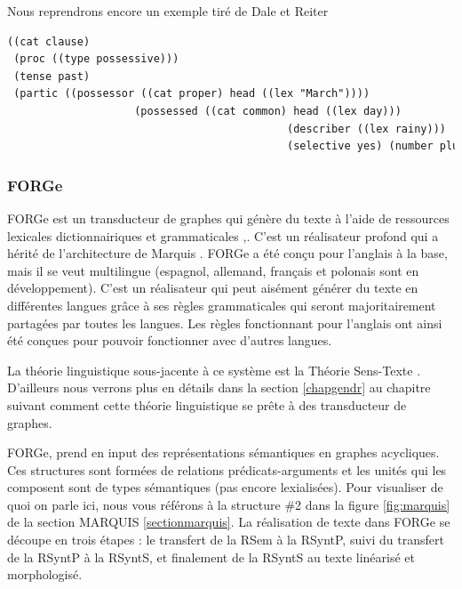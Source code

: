 Nous reprendrons encore un exemple tiré de Dale et Reiter \cite{ReiterBuildingNaturalLanguage2000} 
\begin{lstlisting}[language=Xml, caption=FD: input de Surge, label=surge]
((cat clause)
 (proc ((type possessive)))
 (tense past)
 (partic ((possessor ((cat proper) head ((lex "March"))))
					(possessed ((cat common) head ((lex day)))
											(describer ((lex rainy)))
											(selective yes) (number plural)))))
\end{lstlisting}

\subsubsection{FORGe}
FORGe est un transducteur de graphes qui génère du texte à l'aide de ressources lexicales dictionnairiques et grammaticales \citep{MilledemoFORGePompeu2017},\citep{DBLP:conf/semeval/MilleCBW17}. C'est un réalisateur profond qui a hérité de l'architecture de Marquis \citep{WannerMARQUISGENERATIONUSERTAILORED2010}. FORGe a été conçu pour l'anglais à la base, mais il se veut multilingue (espagnol, allemand, français et polonais sont en développement). C'est un réalisateur qui peut aisément générer du texte en différentes langues grâce à ses règles grammaticales qui seront majoritairement partagées par toutes les langues. Les règles fonctionnant pour l'anglais ont ainsi été conçues pour pouvoir fonctionner avec d'autres langues.

La théorie linguistique sous-jacente à ce système est la Théorie Sens-Texte . D'ailleurs nous verrons plus en détails dans la section \ref{chapgendr} au chapitre suivant comment cette théorie linguistique se prête à des transducteur de graphes.

FORGe, prend en input des représentations sémantiques en graphes acycliques. Ces structures sont formées de relations prédicats-arguments et les unités qui les composent sont de types sémantiques (pas encore lexialisées). Pour visualiser de quoi on parle ici, nous vous référons à la structure \#2 dans la figure \ref{fig:marquis} de la section MARQUIS \ref{sectionmarquis}. La réalisation de texte dans FORGe se découpe en trois étapes : le transfert de la RSem à la RSyntP, suivi du transfert de la RSyntP à la RSyntS, et finalement de la RSyntS au texte linéarisé et morphologisé. 

